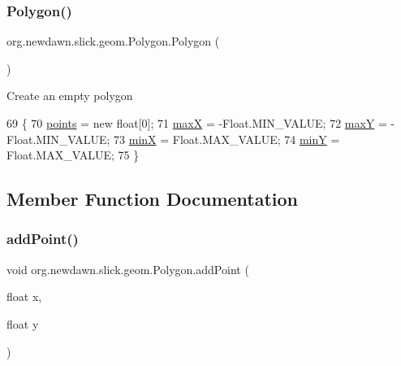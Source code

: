\subsubsection{\texorpdfstring{Polygon()}{Polygon()}\hspace{0.1cm}{\footnotesize\ttfamily [2/2]}}
{\footnotesize\ttfamily org.\+newdawn.\+slick.\+geom.\+Polygon.\+Polygon (\begin{DoxyParamCaption}{ }\end{DoxyParamCaption})\hspace{0.3cm}{\ttfamily [inline]}}

Create an empty polygon 
\begin{DoxyCode}
69                     \{
70         \mbox{\hyperlink{classorg_1_1newdawn_1_1slick_1_1geom_1_1_shape_a8b4d4058734bbb3b96072e470b92aa37}{points}} = \textcolor{keyword}{new} \textcolor{keywordtype}{float}[0];
71         \mbox{\hyperlink{classorg_1_1newdawn_1_1slick_1_1geom_1_1_shape_a8c820b5a7df465beab7f021cdd09b826}{maxX}} = -Float.MIN\_VALUE;
72         \mbox{\hyperlink{classorg_1_1newdawn_1_1slick_1_1geom_1_1_shape_aaacbabfb1b7d0653f59658d92ded1c2b}{maxY}} = -Float.MIN\_VALUE;
73         \mbox{\hyperlink{classorg_1_1newdawn_1_1slick_1_1geom_1_1_shape_a5bd07629e85d4a15fc03e3d60edb7c03}{minX}} = Float.MAX\_VALUE;
74         \mbox{\hyperlink{classorg_1_1newdawn_1_1slick_1_1geom_1_1_shape_a4794592d5238a8c51d9d8ac4a11e68d4}{minY}} = Float.MAX\_VALUE;
75     \}
\end{DoxyCode}


\subsection{Member Function Documentation}
\mbox{\label{classorg_1_1newdawn_1_1slick_1_1geom_1_1_polygon_a62d22ea48361fe38f8868f1f126a7b7a}} 
\subsubsection{\texorpdfstring{add\+Point()}{addPoint()}}
{\footnotesize\ttfamily void org.\+newdawn.\+slick.\+geom.\+Polygon.\+add\+Point (\begin{DoxyParamCaption}\item[{float}]{x,  }\item[{float}]{y }\end{DoxyParamCaption})\hspace{0.3cm}{\ttfamily [inline]}}

